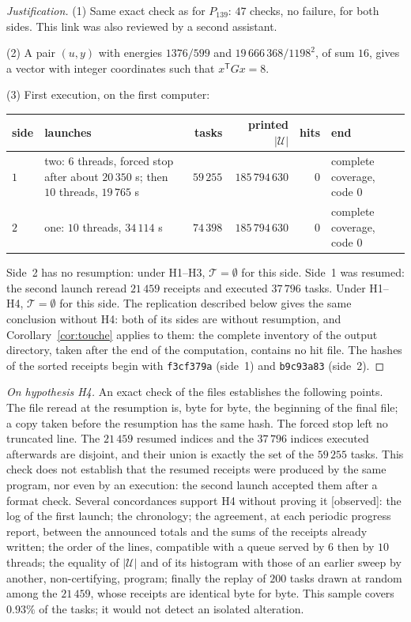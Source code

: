 \documentclass[11pt,a4paper]{amsart}
\theoremstyle{plain}
\theoremstyle{definition}
\numberwithin{equation}{section}
\newcommand{\Uc}{\mathcal{U}}
\newcommand{\Tc}{\mathcal{T}}
\newcommand{\st}[1]{\textup{\textsf{\small[#1]}}}
\newcommand{\CONS}{\st{observed}}
\begin{document}
\begin{proof}[Justification]
(1) Same exact check as for $P_{139}$: $47$ checks, no failure, for both sides. This link was also reviewed by a second assistant.

(2) A pair $(u,y)$ with energies $1376/599$ and $19\,666\,368/1198^2$, of sum $16$, gives a vector with integer coordinates such that $x^{\mathsf T}Gx=8$.

(3) First execution, on the first computer:
\begin{center}\small
\begin{tabular}{l>{\raggedright\arraybackslash}p{4.4cm}rrr>{\raggedright\arraybackslash}p{2.7cm}}
\toprule
side & launches & tasks & printed $|\Uc|$ & hits & end \\
\midrule
$1$ & two: $6$ threads, forced stop after about $20\,350$ s; then $10$ threads, $19\,765$ s & $59\,255$ & $185\,794\,630$ & $0$ & complete coverage, code $0$ \\
$2$ & one: $10$ threads, $34\,114$ s & $74\,398$ & $185\,794\,630$ & $0$ & complete coverage, code $0$ \\
\bottomrule
\end{tabular}
\end{center}
Side~2 has no resumption: under H1--H3, $\Tc=\emptyset$ for this side. Side~1 was resumed: the second launch reread $21\,459$ receipts and executed $37\,796$ tasks. Under H1--H4, $\Tc=\emptyset$ for this side. The replication described below gives the same conclusion without H4: both of its sides are without resumption, and Corollary~\ref{cor:touche} applies to them: the complete inventory of the output directory, taken after the end of the computation, contains no hit file. The hashes of the sorted receipts begin with \texttt{f3cf379a} (side~1) and \texttt{b9c93a83} (side~2).
\end{proof}

\emph{On hypothesis H4.} An exact check of the files establishes the following points. The file reread at the resumption is, byte for byte, the beginning of the final file; a copy taken before the resumption has the same hash. The forced stop left no truncated line. The $21\,459$ resumed indices and the $37\,796$ indices executed afterwards are disjoint, and their union is exactly the set of the $59\,255$ tasks. This check does not establish that the resumed receipts were produced by the same program, nor even by an execution: the second launch accepted them after a format check. Several concordances support H4 without proving it \CONS: the log of the first launch; the chronology; the agreement, at each periodic progress report, between the announced totals and the sums of the receipts already written; the order of the lines, compatible with a queue served by $6$ then by $10$ threads; the equality of $|\Uc|$ and of its histogram with those of an earlier sweep by another, non-certifying, program; finally the replay of $200$ tasks drawn at random among the $21\,459$, whose receipts are identical byte for byte. This sample covers $0.93\%$ of the tasks; it would not detect an isolated alteration.
\end{document}
